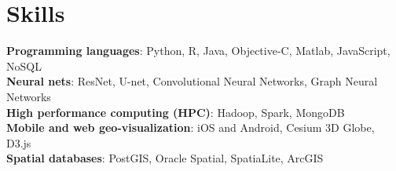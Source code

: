 \documentclass[11pt, a4paper]{article}
\begin{document}

\section*{Skills}
\textbf{Programming languages}: Python, R, Java, Objective-C, Matlab, JavaScript, NoSQL\\
\textbf{Neural nets}: ResNet, U-net, Convolutional Neural Networks, Graph Neural Networks\\
\textbf{High performance computing (HPC)}: Hadoop, Spark, MongoDB\\
\textbf{Mobile and web geo-visualization}: iOS and Android, Cesium 3D Globe, D3.js\\
\textbf{Spatial databases}: PostGIS, Oracle Spatial, SpatiaLite, ArcGIS


\vfill{}
\end{document}
